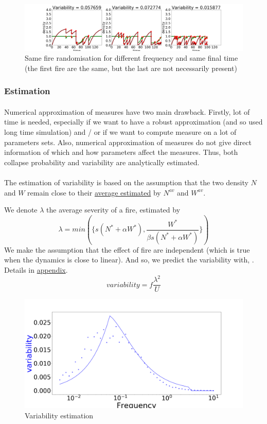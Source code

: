 \documentclass{article}
\begin{document}
\begin{figure}[h!]
\centering
\includegraphics[width=12.cm]{same_1.png}
\caption{Same fire randomisation for different frequency and same final time (the first fire are the same, but the last are not necessarily present)}
\end{figure}


\newpage
\subsubsection{Estimation}
\label{estimation}

\paragraph{} %
Numerical approximation of measures have two main drawback. Firstly, lot of time is needed, especially if we want to have a robust approximation (and so used long time simulation) and / or if we want to compute measure on a lot of parameters sets. Also, numerical approximation of measures do not give direct information of which and how parameters affect the measures. 
Thus, both collapse probability and variability are analytically estimated.

\paragraph{} %
The estimation of variability is based on the assumption that the two density $N$ and $W$ remain close to their \hyperref[average_estimation]{average estimated} by $N^{av}$ and $W^{av}$. 

We denote $\lambda$ the average severity of a fire, estimated by
\[
\lambda = min(\{s(N^*+\alpha W^*), \frac{W^*}{\beta s (N^*+\alpha W^*)}\})
\]
We make the assumption that the effect of fire are independent (which is true when the dynamics is close to linear).
And so, we predict the variability with, \citep{zelnik_impact_2018}. Details in \hyperref[variability_estimation]{appendix}.
\[
variability = f\frac{\lambda^2}{U}
\]



\begin{figure}[h!]
\centering
\includegraphics[width=10.cm]{variability_good.png}
\caption{Variability estimation}
\end{figure}
\end{document}
